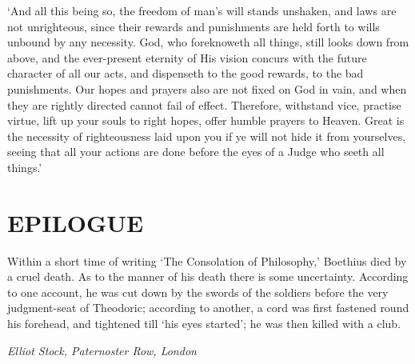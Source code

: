 \documentclass[11pt]{book}
\begin{document}
`And all this being so, the freedom of man's will \linebreak stands unshaken, and
laws are not unrighteous, since their rewards and punishments are held
forth to wills unbound by any necessity. God, who foreknoweth all
things, still looks down from above, and the ever-present eternity of
His vision concurs with the future character of all our acts, and
dispenseth to the good rewards, to the bad punishments. Our hopes and
prayers also are not fixed on God in vain, and when they are rightly
directed cannot fail of effect. Therefore, withstand vice, practise
virtue, lift up your souls to right hopes, offer humble prayers to
Heaven. Great is the necessity of righteousness laid upon you if ye will
not hide it from yourselves, seeing that all your actions are done
before the eyes of a Judge who seeth all things.'



\backmatter

\chapter{EPILOGUE}


Within a short time of writing `The Consolation of Philosophy,' Boethius
died by a cruel death. As to the manner of his death there is some
uncertainty. According to one account, he was cut down by the swords of
the soldiers before the very judgment-seat of Theodoric; according to
another, a cord was first fastened round his forehead, and tightened
till `his eyes started'; he was then killed with a club.

\emph{Elliot Stock, Paternoster Row, London}




\end{document}
